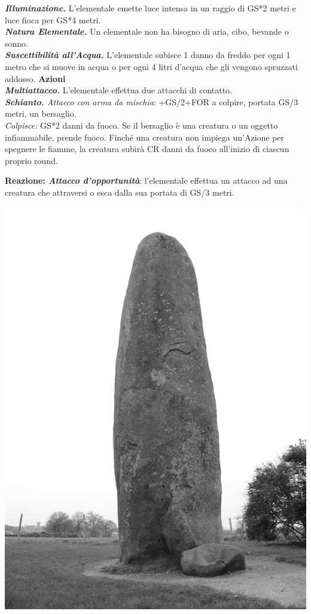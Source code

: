 \begin{multicols}{2}
{\emph{\textbf{Illuminazione.}} L'elementale emette luce intensa in un raggio di GS*2 metri e luce fioca per GS*4 metri.\\
\emph{\textbf{Natura Elementale.}} Un elementale non ha bisogno di aria, cibo, bevande o sonno.\\
\emph{\textbf{Suscettibilità all'Acqua.}} L'elementale subisce 1 danno da freddo per ogni 1 metro che si muove in acqua o per ogni 4 litri d'acqua che gli vengono spruzzati addosso.
\textbf{Azioni}\\
\emph{\textbf{Multiattacco.}} L'elementale effettua due attacchi di contatto.\\
\emph{\textbf{Schianto.} Attacco con arma da mischia}: +GS/2+FOR a colpire, portata GS/3 metri, un bersaglio.\\
\emph{Colpisce:} GS*2 danni da fuoco. Se il bersaglio è una creatura o un oggetto infiammabile, prende fuoco. Finché una creatura non impiega un'Azione per spegnere le fiamme, la creatura subirà CR danni da fuoco all'inizio di ciascun proprio round.

\textbf{Reazione: \emph{Attacco d'opportunità}}: l'elementale effettua un attacco ad una creatura che attraversi o esca dalla sua portata di GS/3 metri.


\begin{center}
	\includegraphics[width=0.6\linewidth]{immagini/eleterra.png}
\end{center}

}
\end{multicols}
